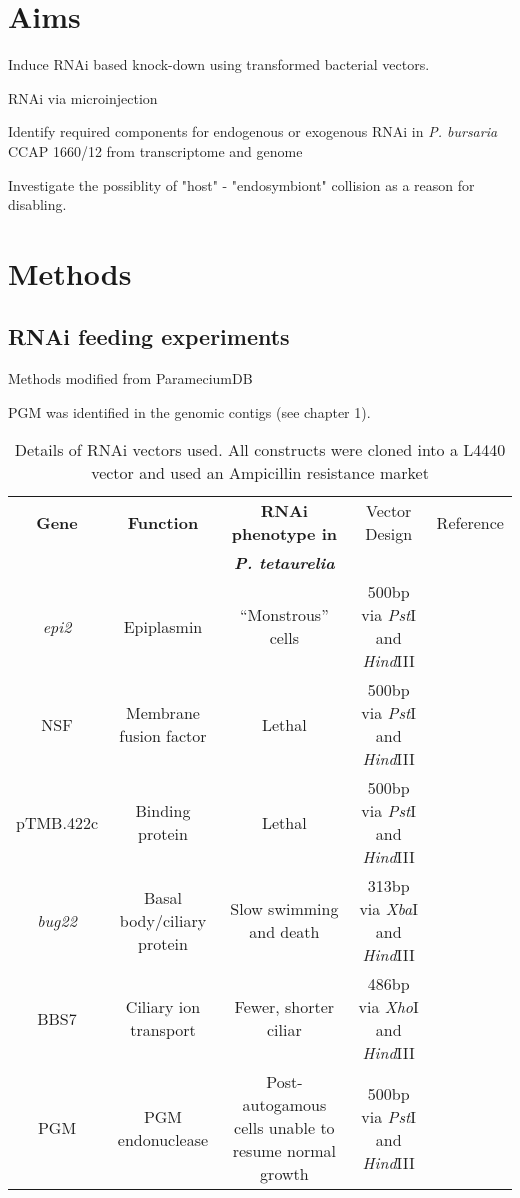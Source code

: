 \section{Aims}

Induce RNAi based knock-down using transformed bacterial vectors.

RNAi via microinjection

Identify required components for endogenous or exogenous RNAi in \textit{P. bursaria} CCAP 1660/12 from transcriptome and genome

Investigate the possiblity of "host" - "endosymbiont" collision as a reason for disabling.


\section{Methods}

\subsection{RNAi feeding experiments}

Methods modified from ParameciumDB 


PGM was identified in the genomic contigs (see chapter 1).

\begin{table}
    \begin{tabular}{|c|c|c|c|c|}
        \hline
    \textbf{Gene} & \textbf{Function} & \textbf{RNAi phenotype in}      & Vector Design & Reference \\
                  &                   & \textbf{\textit{P. tetaurelia}} &               &           \\
        \hline
        \textit{epi2} & Epiplasmin & ``Monstrous'' cells  & 500bp via \textit{Pst}I and \textit{Hind}III & \citep{Damaj2009} \\
        NSF & Membrane fusion factor & Lethal & 500bp via \textit{Pst}I and \textit{Hind}III & \citep{Galvani2002} \\
        pTMB.422c & Binding protein & Lethal & 500bp via \textit{Pst}I and \textit{Hind}III & \citep{Nowack2011} \\
        \textit{bug22} & Basal body/ciliary protein & Slow swimming and death & 313bp via \textit{Xba}I and \textit{Hind}III & \citep{Laligne2010} \\
        BBS7 & Ciliary ion transport & Fewer, shorter ciliar & 486bp via \textit{Xho}I and \textit{Hind}III & \citep{Valentine2012} \\
        PGM & PGM endonuclease & Post-autogamous cells unable to resume normal growth & 500bp via \textit{Pst}I and \textit{Hind}III & \citep{Baudry2009} \\
        \hline
    \end{tabular}
    \caption{Details of RNAi vectors used.  All constructs were cloned into a L4440 vector and used an Ampicillin resistance market}
    \label{tab:rnai_vecs}
\end{table}


